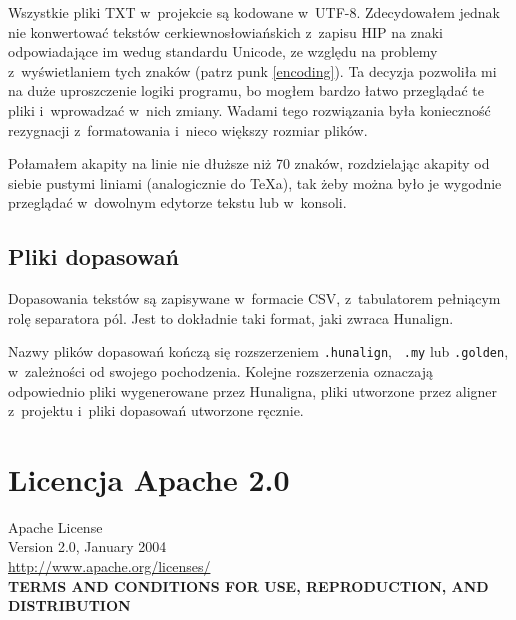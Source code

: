 \documentclass{pracamgr}
\begin{document}
Wszystkie pliki TXT w~projekcie są kodowane w~UTF-8. Zdecydowałem
jednak nie konwertować tekstów cerkiewno\-{}słowiańskich z~zapisu HIP na
znaki odpowiadające im wedug standardu Unicode, ze względu na problemy
z~wyświetlaniem tych znaków (patrz punk \ref{encoding}). Ta decyzja
pozwoliła mi na duże uproszczenie logiki programu, bo mogłem bardzo
łatwo przeglądać te pliki i~wprowadzać w~nich zmiany. Wadami tego
rozwiązania była konieczność rezygnacji z~formatowania i~nieco większy
rozmiar plików.

Połamałem akapity na linie nie dłuższe niż 70 znaków, rozdzielając
akapity od siebie pustymi liniami (analogicznie do TeXa), tak żeby można
było je wygodnie przeglądać w~dowolnym edytorze tekstu lub w~konsoli.

\section{Pliki dopasowań}

Dopasowania tekstów są zapisywane w~formacie CSV, z~tabulatorem
pełniącym rolę separatora pól. Jest to dokładnie taki format, jaki
zwraca Hunalign.

Nazwy plików dopasowań kończą się rozszerzeniem {\tt .hunalign}, {\tt
  .my} lub {\tt .golden}, w~zależności od swojego pochodzenia. Kolejne
rozszerzenia oznaczają odpowiednio pliki wygenerowane przez Hunaligna,
pliki utworzone przez aligner z~projektu i~pliki dopasowań utworzone
ręcznie.

\chapter{Licencja Apache 2.0}\label{r:licencja}

\small

{\centering
  Apache License\\
  Version 2.0, January 2004\\
  \url{http://www.apache.org/licenses/}\\
  \textbf{TERMS AND CONDITIONS FOR USE, REPRODUCTION, AND DISTRIBUTION}\\
}
\end{document}
